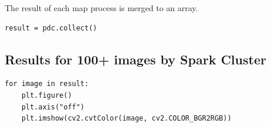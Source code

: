 The result of each map process is merged to an array.

\begin{verbatim}
result = pdc.collect()
\end{verbatim}

\subsection{Results for 100+ images by Spark
Cluster}\label{results-for-100-images-by-spark-cluster}

\begin{verbatim}
for image in result:
    plt.figure()
    plt.axis("off")
    plt.imshow(cv2.cvtColor(image, cv2.COLOR_BGR2RGB))
\end{verbatim}

